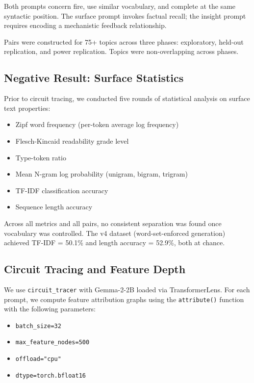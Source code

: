 \documentclass{article}
\begin{document}
Both prompts concern fire, use similar vocabulary, and complete at the same syntactic 
position. The surface prompt invokes factual recall; the insight prompt requires encoding a 
mechanistic feedback relationship.

Pairs were constructed for 75+ topics across three phases: exploratory, held-out replication, 
and power replication. Topics were non-overlapping across phases.

\subsection{Negative Result: Surface Statistics}

Prior to circuit tracing, we conducted five rounds of statistical analysis on surface text 
properties:
\begin{itemize}
\item Zipf word frequency (per-token average log frequency)
\item Flesch-Kincaid readability grade level
\item Type-token ratio
\item Mean N-gram log probability (unigram, bigram, trigram)
\item TF-IDF classification accuracy
\item Sequence length accuracy
\end{itemize}

Across all metrics and all pairs, no consistent separation was found once vocabulary was 
controlled. The v4 dataset (word-set-enforced generation) achieved TF-IDF = 50.1\% and 
length accuracy = 52.9\%, both at chance.

\subsection{Circuit Tracing and Feature Depth}

We use \texttt{circuit\_tracer} \citep{lindsey2025} with Gemma-2-2B loaded via 
TransformerLens. For each prompt, we compute feature attribution graphs using the 
\texttt{attribute()} function with the following parameters:
\begin{itemize}
\item \texttt{batch\_size=32}
\item \texttt{max\_feature\_nodes=500}
\item \texttt{offload="cpu"}
\item \texttt{dtype=torch.bfloat16}
\end{itemize}
\end{document}
